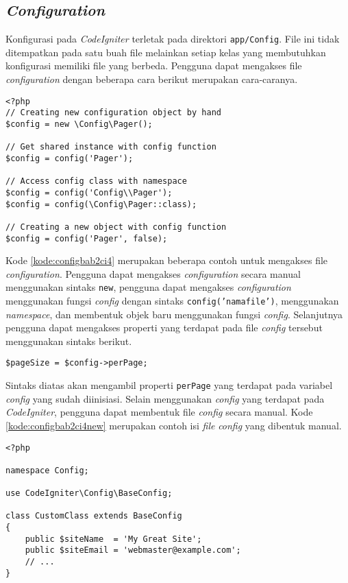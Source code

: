 \subsection{\textit{Configuration}}
Konfigurasi pada \textit{CodeIgniter} terletak pada direktori \texttt{app/Config}. File ini tidak ditempatkan pada satu buah file melainkan setiap kelas yang membutuhkan konfigurasi memiliki file yang berbeda. Pengguna dapat mengakses file \textit{configuration} dengan beberapa cara berikut merupakan cara-caranya.
\begin{lstlisting}[caption=Contoh mengakses file \textit{configuration}. ,label=kode:configbab2ci4]
<?php
// Creating new configuration object by hand
$config = new \Config\Pager();

// Get shared instance with config function
$config = config('Pager');

// Access config class with namespace
$config = config('Config\\Pager');
$config = config(\Config\Pager::class);

// Creating a new object with config function
$config = config('Pager', false);
\end{lstlisting}
Kode \ref{kode:configbab2ci4} merupakan beberapa contoh untuk mengakses file \textit{configuration}. Pengguna dapat mengakses \textit{configuration} secara manual menggunakan sintaks \texttt{new}, pengguna dapat mengakses \textit{configuration} menggunakan fungsi \textit{config} dengan sintaks \texttt{config('namafile')}, menggunakan \textit{namespace}, dan membentuk objek baru menggunakan fungsi \textit{config}. Selanjutnya pengguna dapat mengakses properti yang terdapat pada file \textit{config} tersebut menggunakan sintaks berikut.
\begin{center}
	\verb|$pageSize = $config->perPage;|
\end{center}
Sintaks diatas akan mengambil properti \texttt{perPage} yang terdapat pada variabel \textit{config} yang sudah diinisiasi. Selain menggunakan \textit{config} yang terdapat pada \textit{CodeIgniter}, pengguna dapat membentuk file \textit{config} secara manual. Kode \ref{kode:configbab2ci4new} merupakan contoh isi \textit{file} \textit{config} yang dibentuk manual.
\begin{lstlisting}[caption=Contoh pembentukan file \textit{configuration}. ,label=kode:configbab2ci4new]
<?php

namespace Config;

use CodeIgniter\Config\BaseConfig;

class CustomClass extends BaseConfig
{
    public $siteName  = 'My Great Site';
    public $siteEmail = 'webmaster@example.com';
    // ...
}
\end{lstlisting}
